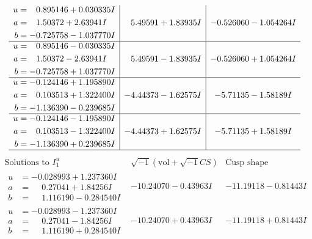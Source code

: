 \documentclass[1p]{elsarticle_modified}
\theoremstyle{definition}
\newcommand{\I}{\sqrt{-1}}
\begin{document}
$$\begin{array}{c|c|c}
\begin{aligned}
u &= \phantom{-}0.895146 + 0.030335 I \\
a &= \phantom{-}1.50372 + 2.63941 I \\
b &= -0.725758 - 1.037770 I\end{aligned}
 & \phantom{-}5.49591 + 1.83935 I & -0.526060 - 1.054264 I \\ \hline\begin{aligned}
u &= \phantom{-}0.895146 - 0.030335 I \\
a &= \phantom{-}1.50372 - 2.63941 I \\
b &= -0.725758 + 1.037770 I\end{aligned}
 & \phantom{-}5.49591 - 1.83935 I & -0.526060 + 1.054264 I \\ \hline\begin{aligned}
u &= -0.124146 + 1.195890 I \\
a &= \phantom{-}0.103513 + 1.322400 I \\
b &= -1.136390 - 0.239685 I\end{aligned}
 & -4.44373 - 1.62575 I & -5.71135 - 1.58189 I \\ \hline\begin{aligned}
u &= -0.124146 - 1.195890 I \\
a &= \phantom{-}0.103513 - 1.322400 I \\
b &= -1.136390 + 0.239685 I\end{aligned}
 & -4.44373 + 1.62575 I & -5.71135 + 1.58189 I\\
 \hline 
 \end{array}$$\newpage$$\begin{array}{c|c|c}  
\text{Solutions to }I^u_{1}& \I (\text{vol} + \sqrt{-1}CS) & \text{Cusp shape}\\
 \hline 
\begin{aligned}
u &= -0.028993 + 1.237360 I \\
a &= \phantom{-}0.27041 + 1.84256 I \\
b &= \phantom{-}1.116190 - 0.284540 I\end{aligned}
 & -10.24070 - 0.43963 I & -11.19118 - 0.81443 I \\ \hline\begin{aligned}
u &= -0.028993 - 1.237360 I \\
a &= \phantom{-}0.27041 - 1.84256 I \\
b &= \phantom{-}1.116190 + 0.284540 I\end{aligned}
 & -10.24070 + 0.43963 I & -11.19118 + 0.81443 I \\ \hline\begin{aligned}

\end{aligned}
\end{array}$$
\end{document}
